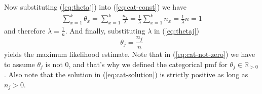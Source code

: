 Now substituting (\ref{eq:thetaj}) into (\ref{eq:cat-const}) we have
\begin{subequations}
\begin{align}
\sum_{x=1}^k \theta_x  = \sum_{x=1}^k \frac{n_x}{\lambda} = \frac{1}{\lambda} \sum_{x=1}^k n_x = \frac{1}{\lambda} n  = 1
\end{align}
\end{subequations}
and therefore $\lambda = \frac{1}{n}$. And finally, substituting $\lambda$ in (\ref{eq:thetaj})
\begin{equation}
	\theta_j =  \frac{n_j}{n} \label{eq:cat-solution}
\end{equation}
yields the maximum likelihood estimate.
Note that in (\ref{eq:cat-not-zero}) we have to assume $\theta_j$ is not 0, and that's why we defined the categorical pmf for $\theta_j \in \mathbb R_{>0}$. Also note that the solution in (\ref{eq:cat-solution}) is strictly positive as long as $n_j > 0$.


